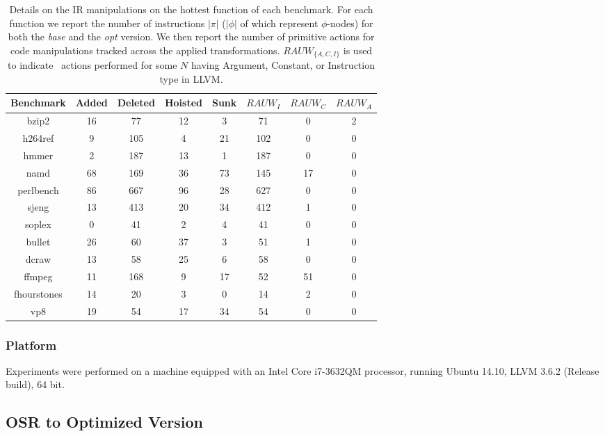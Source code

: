 \begin{table}[!t]
\begin{center}
\begin{small}
\begin{tabular}{|c|c|c|c|c|c|c|c|}
\hline
Benchmark & Added & Deleted & Hoisted & Sunk & $RAUW_I$ & $RAUW_C$ & $RAUW_A$ \\
\hline
\hline
bzip2 & 16 & 77 & 12 & 3 & 71 & 0 & 2 \\
\hline
h264ref & 9 & 105 & 4 & 21 & 102 & 0 & 0 \\
\hline
hmmer & 2 & 187 & 13 & 1 & 187 & 0 & 0 \\
\hline
namd & 68 & 169 & 36 & 73 & 145 & 17 & 0 \\
\hline
perlbench & 86 & 667 & 96 & 28 & 627 & 0 & 0 \\
\hline
sjeng & 13 & 413 & 20 & 34 & 412 & 1 & 0 \\
\hline
soplex & 0 & 41 & 2 & 4 & 41 & 0 & 0 \\
\hline
bullet & 26 & 60 & 37 & 3 & 51 & 1 & 0 \\
\hline
dcraw & 13 & 58 & 25 & 6 & 58 & 0 & 0 \\
\hline
ffmpeg & 11 & 168 & 9 & 17 & 52 & 51 & 0 \\
\hline
fhourstones & 14 & 20 & 3 & 0 & 14 & 2 & 0 \\
\hline
vp8 & 19 & 54 & 17 & 34 & 54 & 0 & 0 \\
\hline
\end{tabular} 
\end{small}
\end{center}
\caption{\label{tab:OSR-alC-bench-IR} Details on the IR manipulations on the hottest function of each benchmark. For each function we report the number of instructions $|\pi|$ ($|\phi|$ of which represent $\phi$-nodes) for both the {\em base} and the {\em opt} version. We then report the number of primitive actions for code manipulations tracked across the applied transformations. $RAUW_{\{A,C,I\}}$ is used to indicate \RAUWfull\ actions performed for some {$N$} having Argument, Constant, or Instruction type in LLVM.
} 
\end{table}

\subsubsection*{Platform}
Experiments were performed on a machine equipped with an Intel Core i7-3632QM processor, running Ubuntu 14.10, LLVM 3.6.2 (Release build), 64 bit.

\subsection{OSR to Optimized Version}

